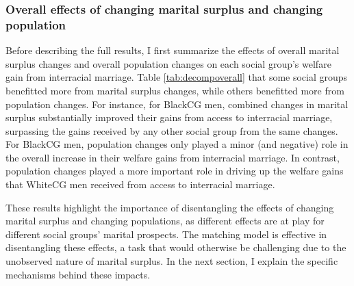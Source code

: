 \subsubsection{Overall effects of changing marital surplus and changing population}

Before describing the full results, I first summarize the effects of overall marital surplus changes and overall population changes on each social group's welfare gain from interracial marriage. Table \ref{tab:decompoverall} that some social groups benefitted more from marital surplus changes, while others benefitted more from population changes. For instance, for BlackCG men, combined changes in marital surplus substantially improved their gains from access to interracial marriage, surpassing the gains received by any other social group from the same changes.  For BlackCG men, population changes only played a minor (and negative) role in the overall increase in their welfare gains from interracial marriage. In contrast, population changes played a more important role in driving up the welfare gains that WhiteCG men received from access to interracial marriage. 

These results highlight the importance of disentangling the effects of changing marital surplus and changing populations, as different effects are at play for different social groups' marital prospects. The matching model is effective in disentangling these effects, a task that would otherwise be challenging due to the unobserved nature of marital surplus. In the next section, I explain the specific mechanisms behind these impacts.



